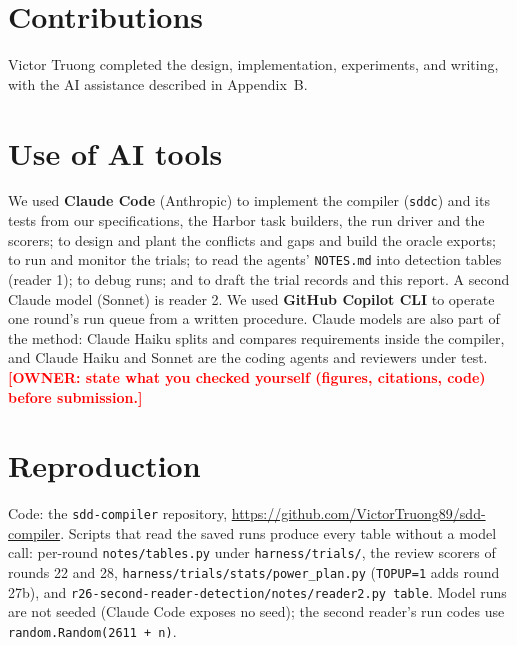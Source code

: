\documentclass{article}
\newcommand{\owner}[1]{\textcolor{red}{\textbf{[OWNER: #1]}}}
\newcommand{\code}[1]{\texttt{#1}}
\begin{document}



\appendix

\section{Contributions}
Victor Truong completed the design, implementation, experiments, and writing, with the AI assistance
described in Appendix~B.

\section{Use of AI tools}
We used \textbf{Claude Code} (Anthropic) to implement the compiler (\code{sddc}) and its tests from our
specifications, the Harbor task builders, the run driver and the scorers; to design and plant the
conflicts and gaps and build the oracle exports; to run and monitor the trials; to read the agents'
\code{NOTES.md} into detection tables (reader 1); to debug runs; and to draft the trial records and this
report. A second Claude model (Sonnet) is reader 2. We used \textbf{GitHub Copilot CLI} to operate one round's
run queue from a written procedure. Claude models are also part of the method: Claude Haiku splits and
compares requirements inside the compiler, and Claude Haiku and Sonnet are the coding agents and reviewers
under test. \owner{state what you checked yourself (figures, citations, code) before submission.}

\section{Reproduction}
Code: the \code{sdd-compiler} repository, \url{https://github.com/VictorTruong89/sdd-compiler}. Scripts that read the saved runs produce every table without a model call: per-round \code{notes/tables.py} under \code{harness/trials/}, the review
scorers of rounds 22 and 28, \code{harness/trials/stats/power\_plan.py} (\code{TOPUP=1} adds round 27b), and
\code{r26-second-reader-detection/notes/reader2.py table}. Model runs are not seeded (Claude Code exposes no
seed); the second reader's run codes use \code{random.Random(2611 + n)}.
\end{document}
